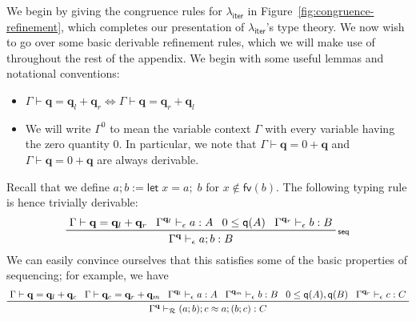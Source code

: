 \documentclass[acmsmall,screen,review]{acmart}
\newcommand{\mc}[1]{\ensuremath{\mathcal{#1}}}
\newcommand{\mb}[1]{\ensuremath{\mathbf{#1}}}
\newcommand{\ms}[1]{\ensuremath{\mathsf{#1}}}
\newcommand{\letexpr}[3]{\ensuremath{\ms{let}\;#1 = #2;\;#3}}
\newcommand{\qsp}[4]{#1 \vdash #2 = #3 + #4}
\newcommand{\rle}[1]{{\scriptsize\textsf{#1}}}
\newcommand{\hasty}[4]{#1 \vdash_{#2} #3: {#4}}
\newcommand{\teqv}{\approx}
\newcommand{\tmeq}[5]{#1 \vdash_{#2} #3 \teqv #4 : {#5}}
\newcommand{\subiterexp}{\texorpdfstring{\(\lambda_{\ms{iter}}\)}{lambda-iter}}
\newcommand{\zeroq}{0}
\newcommand{\alquant}{\ms{q}}
\begin{document}
We begin by giving the congruence rules for \subiterexp{} in Figure~\ref{fig:congruence-refinement},
which completes our presentation of \subiterexp{}'s type theory. We now wish to go over some basic
derivable refinement rules, which we will make use of throughout the rest of the appendix. We begin
with some useful lemmas and notational conventions:
\begin{itemize}
  \item $\qsp{\Gamma}{\mb{q}}{\mb{q}_l}{\mb{q}_r} \iff \qsp{\Gamma}{\mb{q}}{\mb{q}_r}{\mb{q}_l}$
  \item We will write $\Gamma^\zeroq$ to mean the variable context $\Gamma$ with every variable
  having the zero quantity $\zeroq$. In particular, we note that $\qsp{\Gamma}{\mb{q}}{0}{\mb{q}}$
  and $\qsp{\Gamma}{\mb{q}}{0}{\mb{q}}$ are always derivable.
\end{itemize}
Recall that we define $a ; b := \letexpr{x}{a}{b}$ for $x \notin \ms{fv}(b)$. The following typing
rule is hence trivially derivable:
\begin{equation*}
  \prftree[r]{\rle{seq}}
    {\qsp{\Gamma}{\mb{q}}{\mb{q}_l}{\mb{q}_r}}
    {\hasty{\Gamma^{\mb{q}_l}}{\epsilon}{a}{A}}
    {0 \leq \alquant(A)}
    {\hasty{\Gamma^{\mb{q}_r}}{\epsilon}{b}{B}}
    {\hasty{\Gamma^{\mb{q}}}{\epsilon}{a ; b}{B}}
\end{equation*}
We can easily convince ourselves that this satisfies some of the basic properties of sequencing; for
example, we have
\begin{equation*}
  \prftree[r]{}
    {\qsp{\Gamma}{\mb{q}}{\mb{q}_l}{\mb{q}_c}}
    {\qsp{\Gamma}{\mb{q}_c}{\mb{q}_r}{\mb{q}_m}}
    {\hasty{\Gamma^{\mb{q}_l}}{\epsilon}{a}{A}}
    {\hasty{\Gamma^{\mb{q}_m}}{\epsilon}{b}{B}}
    {0 \leq \alquant(A), \alquant(B)}
    {\hasty{\Gamma^{\mb{q}_r}}{\epsilon}{c}{C}}
    {\tmeq{\Gamma^{\mb{q}}}{\mc{R}}{(a ; b) ; c}{a ; (b ; c)}{C}}
\end{equation*}
\end{document}
